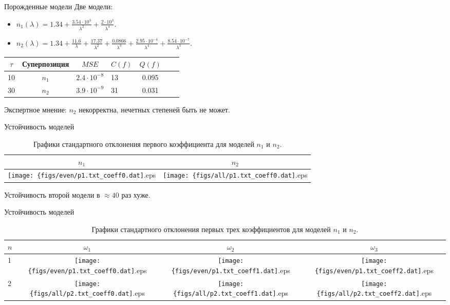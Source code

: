 \documentclass{beamer}
\begin{document}
\begin{frame}{Порожденные модели}
  Две модели:
  \begin{itemize}
    \item $n_1(\lambda) = 1.34 + \frac{3.54 \cdot 10^3}{\lambda^2} + \frac{2 \cdot 10^3}{\lambda^4}$.
    \item $n_2(\lambda) = 1.34 + \frac{11.6}{\lambda} + \frac{17.37}{\lambda^2} + \frac{0.0866}{\lambda^3} + \frac{2.95 \cdot 10^{-4}}{\lambda^4} + \frac{8.54 \cdot 10^{-7}}{\lambda^5}.$
  \end{itemize}
  
  \begin{table}[h]
    \centering
    \begin{tabular}{| c | c | c | l | c | c | c |} \hline
  	$\tau$	& Суперпозиция		& $MSE$					& $C(f)$		& $Q(f)$ \\ \hline
	10	  	& $n_1$		  		& $2.4 \cdot 10^{-8}$	& 13			& 0.095	\\ \hline
	30		& $n_2$				& $3.9 \cdot 10^{-9}$	& 31			& 0.031	\\ \hline
    \end{tabular}
  \end{table}
  
  Экспертное мнение: $n_2$ некорректна, нечетных степеней быть не может.
\end{frame}

\begin{frame}{Устойчивость моделей}
\begin{table}[h]
    \centering
    \begin{tabular}{c | c}
	  $n_1$ & $n_2$ \\ \hline
	  \texttt{[image: \{figs/even/p1.txt\_coeff0.dat]}.eps} & \texttt{[image: \{figs/all/p1.txt\_coeff0.dat]}.eps} \\
    \end{tabular}
    \caption{Графики стандартного отклонения первого коэффициента для моделей $n_1$ и $n_2$.}
  \end{table}
  
  Устойчивость второй модели в $\approx 40$ раз хуже.
\end{frame}

\begin{frame}{Устойчивость моделей}
  \begin{table}[h]
    \centering
    \begin{tabular}{l | c c c}
	  $n$ & $\omega_1$ & $\omega_2$ & $\omega_3$ \\ \hline
	  1 & \texttt{[image: \{figs/even/p1.txt\_coeff0.dat]}.eps} & \texttt{[image: \{figs/even/p1.txt\_coeff1.dat]}.eps} & \texttt{[image: \{figs/even/p1.txt\_coeff2.dat]}.eps} \\
	  2 & \texttt{[image: \{figs/all/p2.txt\_coeff0.dat]}.eps} & \texttt{[image: \{figs/all/p2.txt\_coeff1.dat]}.eps} & \texttt{[image: \{figs/all/p2.txt\_coeff2.dat]}.eps}
    \end{tabular}
    \caption{Графики стандартного отклонения первых трех коэффициентов для моделей $n_1$ и $n_2$.}
  \end{table}
\end{frame}
\end{document}
